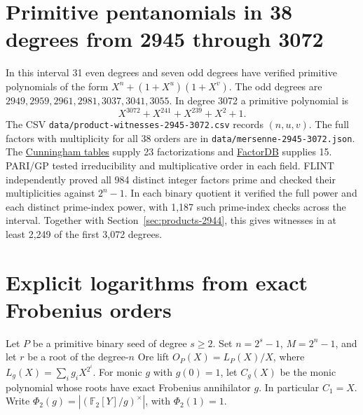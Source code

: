 \documentclass[11pt]{article}
\newcommand{\F}{\mathbb F_2}
\begin{document}
\section{Primitive pentanomials in 38 degrees from 2945 through 3072}
\label{sec:products-3072}
In this interval 31 even degrees and seven odd degrees have verified
primitive polynomials of the form \(X^n+(1+X^u)(1+X^v)\). The odd
degrees are \(2949,2959,2961,2981,3037,3041,3055\). In degree 3072 a
primitive polynomial is
\[
                       X^{3072}+X^{241}+X^{239}+X^2+1.
\]
The CSV \nolinkurl{data/product-witnesses-2945-3072.csv} records
\((n,u,v)\). The full factors with multiplicity for all 38 orders are
in \nolinkurl{data/mersenne-2945-3072.json}. The
\href{https://github.com/postvakje/Reformatted-Cunningham-Project-tables/tree/dff2e282ff15399b16b4fb840a410aa2a37076b7}{Cunningham tables}
supply 23 factorizations and
\href{https://factordb.com/index.php?query=2\%5E3072-1}{FactorDB} supplies 15.
PARI/GP tested irreducibility and multiplicative order in each field.
FLINT independently proved all 984 distinct integer factors prime and
checked their multiplicities against \(2^n-1\). In each binary quotient
it verified the full power and each distinct prime-index power, with
1,187 such prime-index checks across the interval. Together with
Section~\ref{sec:products-2944}, this gives witnesses in at least 2,249
of the first 3,072 degrees.

\section{Explicit logarithms from exact Frobenius orders}\label{sec:ore-class-logs}
Let \(P\) be a primitive binary seed of degree \(s\ge2\). Set \(n=2^s-1\),
\(M=2^n-1\), and let \(r\) be a root of the degree-\(n\) Ore lift
\(O_P(X)=L_P(X)/X\), where \(L_g(X)=\sum_i g_iX^{2^i}\).
For monic \(g\) with \(g(0)=1\), let \(C_g(X)\) be the monic polynomial
whose roots have exact Frobenius annihilator \(g\). In particular
\(C_1=X\). Write \(\Phi_2(g)=|(\F[Y]/g)^\times|\), with \(\Phi_2(1)=1\).
\end{document}
